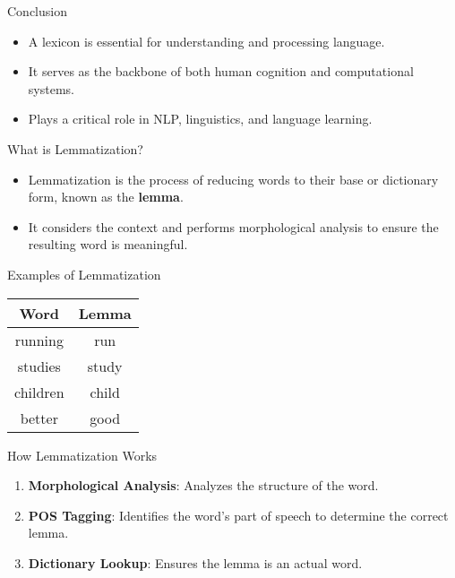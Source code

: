 \begin{frame}{Conclusion}
	\begin{itemize}
		\item A lexicon is essential for understanding and processing language.
		\item It serves as the backbone of both human cognition and computational systems.
		\item Plays a critical role in NLP, linguistics, and language learning.
	\end{itemize}
\end{frame}

\begin{frame}{What is Lemmatization?}
	\begin{itemize}
		\item Lemmatization is the process of reducing words to their base or dictionary form, known as the \textbf{lemma}.
		\item It considers the context and performs morphological analysis to ensure the resulting word is meaningful.
	\end{itemize}
\end{frame}


\begin{frame}{Examples of Lemmatization}
	\begin{table}[]
		\centering
		\begin{tabular}{|c|c|}
			\hline
			\textbf{Word}  & \textbf{Lemma} \\
			\hline
			running        & run            \\
			studies        & study          \\
			children       & child          \\
			better         & good           \\
			\hline
		\end{tabular}
	\end{table}
\end{frame}

\begin{frame}{How Lemmatization Works}
	\begin{enumerate}
		\item \textbf{Morphological Analysis}: Analyzes the structure of the word.
		\item \textbf{POS Tagging}: Identifies the word's part of speech to determine the correct lemma.
		\item \textbf{Dictionary Lookup}: Ensures the lemma is an actual word.
	\end{enumerate}
\end{frame}


